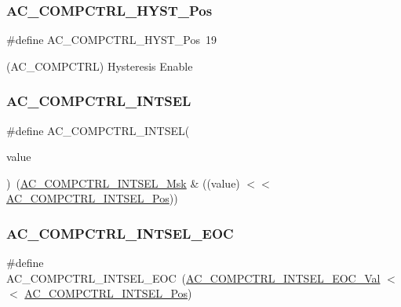 \subsubsection{\texorpdfstring{AC\_COMPCTRL\_HYST\_Pos}{AC\_COMPCTRL\_HYST\_Pos}}
{\footnotesize\ttfamily \#define A\+C\+\_\+\+C\+O\+M\+P\+C\+T\+R\+L\+\_\+\+H\+Y\+S\+T\+\_\+\+Pos~19}



(A\+C\+\_\+\+C\+O\+M\+P\+C\+T\+RL) Hysteresis Enable 

\mbox{\label{group___s_a_m_d21___a_c_ga492036182357ecb681dac2aab9a30d17}} 
\subsubsection{\texorpdfstring{AC\_COMPCTRL\_INTSEL}{AC\_COMPCTRL\_INTSEL}}
{\footnotesize\ttfamily \#define A\+C\+\_\+\+C\+O\+M\+P\+C\+T\+R\+L\+\_\+\+I\+N\+T\+S\+EL(\begin{DoxyParamCaption}\item[{}]{value }\end{DoxyParamCaption})~(\mbox{\hyperlink{group___s_a_m_d21___a_c_ga8deca2c36985d9863363ff10aa6b822a}{A\+C\+\_\+\+C\+O\+M\+P\+C\+T\+R\+L\+\_\+\+I\+N\+T\+S\+E\+L\+\_\+\+Msk}} \& ((value) $<$$<$ \mbox{\hyperlink{group___s_a_m_d21___a_c_gaf17b8514f92bb9fa7999607938ab4994}{A\+C\+\_\+\+C\+O\+M\+P\+C\+T\+R\+L\+\_\+\+I\+N\+T\+S\+E\+L\+\_\+\+Pos}}))}

\mbox{\label{group___s_a_m_d21___a_c_ga7770e554685fc4587b354bc88715e8d8}} 
\subsubsection{\texorpdfstring{AC\_COMPCTRL\_INTSEL\_EOC}{AC\_COMPCTRL\_INTSEL\_EOC}}
{\footnotesize\ttfamily \#define A\+C\+\_\+\+C\+O\+M\+P\+C\+T\+R\+L\+\_\+\+I\+N\+T\+S\+E\+L\+\_\+\+E\+OC~(\mbox{\hyperlink{group___s_a_m_d21___a_c_gad5b505d36ebe43b2bd56cc421c3f4ff7}{A\+C\+\_\+\+C\+O\+M\+P\+C\+T\+R\+L\+\_\+\+I\+N\+T\+S\+E\+L\+\_\+\+E\+O\+C\+\_\+\+Val}}    $<$$<$ \mbox{\hyperlink{group___s_a_m_d21___a_c_gaf17b8514f92bb9fa7999607938ab4994}{A\+C\+\_\+\+C\+O\+M\+P\+C\+T\+R\+L\+\_\+\+I\+N\+T\+S\+E\+L\+\_\+\+Pos}})}

